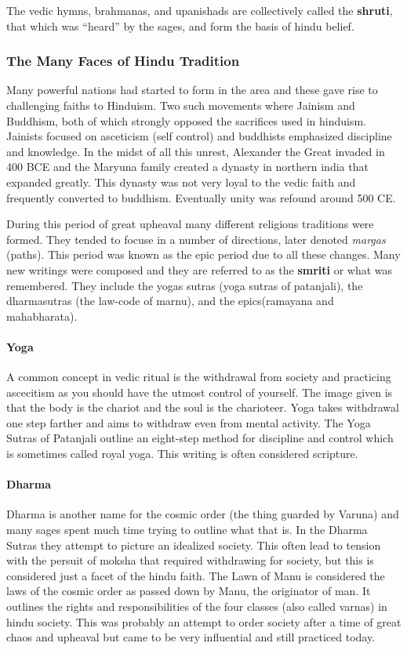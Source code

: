 \documentclass{article}
\begin{document}
The vedic hymns, brahmanas, and upanishads are collectively called the \textbf{shruti}, that which was ``heard'' by the sages, and form the basis of hindu belief.

\subsubsection{The Many Faces of Hindu Tradition}
\label{ssub:the_many_faces_of_hindu_tradition}
Many powerful nations had started to form in the area and these gave rise to challenging faiths to Hinduism. Two such movements where Jainism and Buddhism, both of which strongly opposed the sacrifices used in hinduism. Jainists focused on asceticism (self control) and buddhists emphasized discipline and knowledge. In the midst of all this unrest, Alexander the Great invaded in 400 BCE and the Maryuna family created a dynasty in northern india that expanded greatly. This dynasty was not very loyal to the vedic faith and frequently converted to buddhism. Eventually unity was refound around 500 CE.

During this period of great upheaval many different religious traditions were formed. They tended to focuse in a number of directions, later denoted \emph{margas} (paths). This period was known as the epic period due to all these changes. Many new writings were composed and they are referred to as the \textbf{smriti} or what was remembered. They include the yogas sutras (yoga sutras of patanjali), the dharmasutras (the law-code of marnu), and the epics(ramayana and mahabharata).

\paragraph{Yoga}
\label{par:yoga}
A common concept in vedic ritual is the withdrawal from society and practicing ascecitism as you should have the utmost control of yourself. The image given is that the body is the chariot and the soul is the charioteer. Yoga takes withdrawal one step farther and aims to withdraw even from mental activity. The Yoga Sutras of Patanjali outline an eight-step method for discipline and control which is sometimes called royal yoga. This writing is often considered scripture.

\paragraph{Dharma}
\label{par:dharma}
Dharma is another name for the cosmic order (the thing guarded by Varuna) and many sages spent much time trying to outline what that is. In the Dharma Sutras they attempt to picture an idealized society. This often lead to tension with the persuit of moksha that required withdrawing for society, but this is considered just a facet of the hindu faith. The Lawn of Manu is considered the laws of the cosmic order as passed down by Manu, the originator of man. It outlines the rights and responsibilities of the four classes (also called varnas) in hindu society. This was probably an attempt to order society after a time of great chaos and upheaval but came to be very influential and still practiced today.
\end{document}
